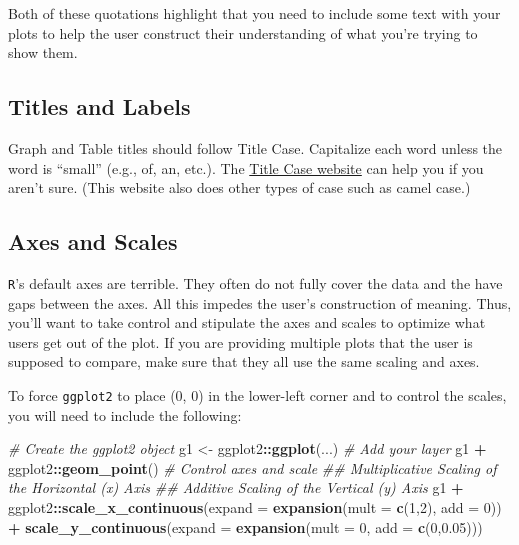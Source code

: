 \documentclass[
]{book}
\newenvironment{Shaded}{\begin{snugshade}}{\end{snugshade}}
\newcommand{\CommentTok}[1]{\textcolor[rgb]{0.56,0.35,0.01}{\textit{#1}}}
\newcommand{\DataTypeTok}[1]{\textcolor[rgb]{0.13,0.29,0.53}{#1}}
\newcommand{\DecValTok}[1]{\textcolor[rgb]{0.00,0.00,0.81}{#1}}
\newcommand{\FloatTok}[1]{\textcolor[rgb]{0.00,0.00,0.81}{#1}}
\newcommand{\KeywordTok}[1]{\textcolor[rgb]{0.13,0.29,0.53}{\textbf{#1}}}
\newcommand{\NormalTok}[1]{#1}
\newcommand{\OperatorTok}[1]{\textcolor[rgb]{0.81,0.36,0.00}{\textbf{#1}}}
\newcommand{\StringTok}[1]{\textcolor[rgb]{0.31,0.60,0.02}{#1}}
\begin{document}
Both of these quotations highlight that you need to include some text with your plots to help the user construct their understanding of what you're trying to show them.

\hypertarget{titles-and-labels}{%
\subsection{Titles and Labels}\label{titles-and-labels}}

Graph and Table titles should follow Title Case. Capitalize each word unless the word is ``small'' (e.g., of, an, etc.). The \href{https://titlecase.com/}{Title Case website} can help you if you aren't sure. (This website also does other types of case such as camel case.)

\hypertarget{axes-and-scales}{%
\subsection{Axes and Scales}\label{axes-and-scales}}

\texttt{R}'s default axes are terrible. They often do not fully cover the data and the have gaps between the axes. All this impedes the user's construction of meaning. Thus, you'll want to take control and stipulate the axes and scales to optimize what users get out of the plot. If you are providing multiple plots that the user is supposed to compare, make sure that they all use the same scaling and axes.

To force \texttt{ggplot2} to place (0, 0) in the lower-left corner and to control the scales, you will need to include the following:

\begin{Shaded}
\begin{Highlighting}[]
\CommentTok{# Create the ggplot2 object}
\NormalTok{g1 <-}\StringTok{ }\NormalTok{ggplot2}\OperatorTok{::}\KeywordTok{ggplot}\NormalTok{(...)}
\CommentTok{# Add your layer}
\NormalTok{g1 }\OperatorTok{+}\StringTok{ }\NormalTok{ggplot2}\OperatorTok{::}\KeywordTok{geom_point}\NormalTok{()}
\CommentTok{# Control axes and scale}
\CommentTok{## Multiplicative Scaling of the Horizontal (x) Axis}
\CommentTok{## Additive Scaling of the Vertical (y) Axis}
\NormalTok{g1 }\OperatorTok{+}\StringTok{ }\NormalTok{ggplot2}\OperatorTok{::}\KeywordTok{scale_x_continuous}\NormalTok{(}\DataTypeTok{expand =} \KeywordTok{expansion}\NormalTok{(}\DataTypeTok{mult =} \KeywordTok{c}\NormalTok{(}\DecValTok{1}\NormalTok{,}\DecValTok{2}\NormalTok{), }\DataTypeTok{add =} \DecValTok{0}\NormalTok{)) }\OperatorTok{+}\StringTok{ }
\StringTok{  }\KeywordTok{scale_y_continuous}\NormalTok{(}\DataTypeTok{expand =} \KeywordTok{expansion}\NormalTok{(}\DataTypeTok{mult =} \DecValTok{0}\NormalTok{, }\DataTypeTok{add =} \KeywordTok{c}\NormalTok{(}\DecValTok{0}\NormalTok{,}\FloatTok{0.05}\NormalTok{))) }
\end{Highlighting}
\end{Shaded}
\end{document}
